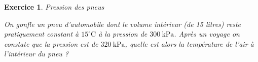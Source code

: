 \documentclass[a4paper,12pt]{article}
\newtheorem{exercice}{Exercice}
\newtheorem{corrige}{Corrig\'e exercice}
\newcommand{\C}{\mathrm{C}}
\newcommand{\oC}{^\circ\C}
\begin{document}
\begin{exercice}{Pression des pneus}

On gonfle un pneu d’automobile dont le volume intérieur
(de 15 litres) reste pratiquement constant à $15\oC$ à la pression de $300\ \mathrm{kPa}$.
Après un voyage on constate que la pression est de $320\ \mathrm{kPa}$, quelle est alors la température de l’air à
l’intérieur du pneu ?
\end{exercice}























\end{document}
